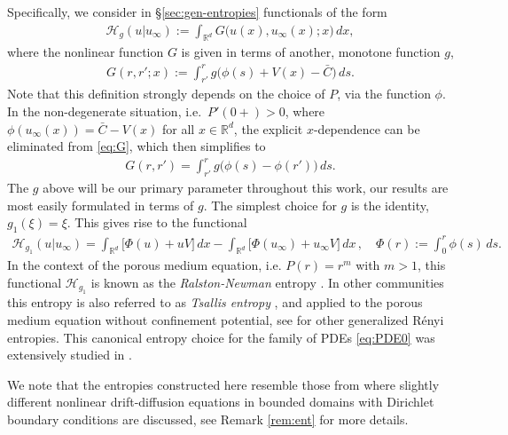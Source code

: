 \documentclass[reqno]{amsart}
\newcommand{\setR}{\mathbb{R}}
\newcommand{\R}{\mathbb{R}}
\begin{document}
Specifically, we consider in \S\ref{sec:gen-entropies} functionals of the form
\begin{align}
  \label{eq:H}
  \mathcal H_g(u|u_\infty) := \int_{\R^d} G\big(u(x),u_\infty(x);x\big)\,dx, 
\end{align}
where the nonlinear function $G$ is given in terms of another, monotone function $g$,
\begin{align}
  \label{eq:G}
  G(r,r';x) := \int_{r'}^r g\big(\phi(s)+V(x)-\bar  C\big)\,ds .
\end{align}
Note that this definition strongly depends on the choice of $P$, via the function $\phi$. 
In the non-degenerate situation, i.e.\ $P'(0+)>0$, where $\phi(u_\infty(x))=\bar C-V(x)$ for all $x\in\R^d$, the explicit $x$-dependence can be eliminated from \eqref{eq:G}, which then simplifies to
\begin{align*}
    G(r,r') = \int_{r'}^r g\big(\phi(s)-\phi(r')\big)\,ds.
\end{align*}
The $g$ above will be our primary parameter throughout this work, our results are most easily formulated in terms of $g$. The simplest choice for $g$ is the identity, $g_1(\xi)=\xi$. This gives rise to the functional
\begin{align*}
    \mathcal H_{g_1}(u|u_\infty) 
    = \int_{\setR^d} \big[\Phi(u) + u V\big]\,dx
    - \int_{\setR^d} \big[\Phi(u_\infty) + u_\infty V\big]\,dx\,,
    \quad \Phi(r):=\int_0^r\phi(s)\,ds.
\end{align*}
In the context of the porous medium equation, i.e. $P(r)=r^m$ with $m>1$, this functional $\mathcal H_{g_1}$ is known as the \emph{Ralston-Newman} entropy \cite{New84,Ral84}. In other communities this entropy is also referred to as \emph{Tsallis entropy} \cite{T88,To14,CT14}, and applied to the porous medium equation without confinement potential, see \cite{To14,CT14} for other generalized R\'enyi entropies. This canonical entropy choice for the family of PDEs \eqref{eq:PDE0} was extensively studied in \cite{otto,CT01,CJMTU,DD02,J16}.

We note that the entropies constructed here resemble those from \cite{BLMV14} where slightly different nonlinear drift-diffusion equations in bounded domains with Dirichlet boundary conditions are discussed, see Remark \ref{rem:ent} for more details.  
\end{document}
